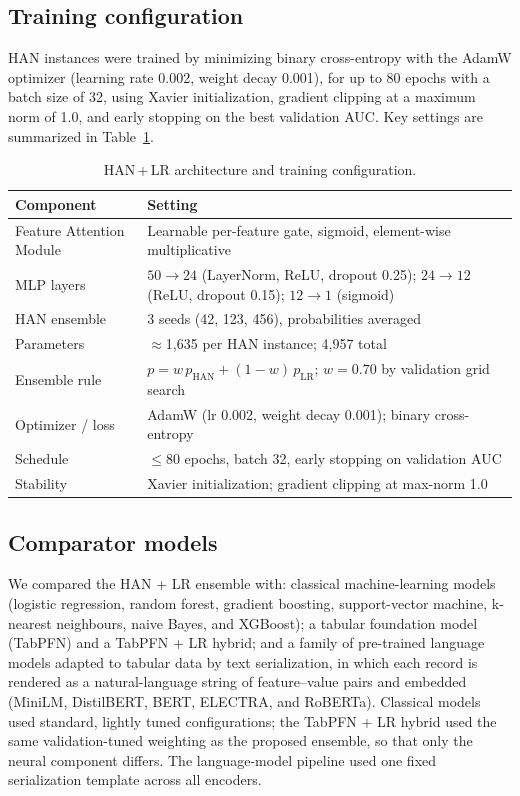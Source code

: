\documentclass[12pt,a4paper]{article}
\begin{document}
\subsection*{Training configuration}

HAN instances were trained by minimizing binary cross-entropy with the AdamW optimizer (learning rate 0.002, weight decay 0.001), for up to 80 epochs with a batch size of 32, using Xavier initialization, gradient clipping at a maximum norm of 1.0, and early stopping on the best validation AUC. Key settings are summarized in Table~\ref{tab::config}.

\begin{table}[H]
\setlength{\abovecaptionskip}{5pt}
\caption{HAN\,+\,LR architecture and training configuration.}
\label{tab::config}
\centering
\footnotesize
\begin{tabular}{@{}p{}p{}@{}}
\toprule
\textbf{Component} & \textbf{Setting} \\
\midrule
Feature Attention Module & Learnable per-feature gate, sigmoid, element-wise multiplicative \\
MLP layers & $50\rightarrow24$ (LayerNorm, ReLU, dropout 0.25); $24\rightarrow12$ (ReLU, dropout 0.15); $12\rightarrow1$ (sigmoid) \\
HAN ensemble & 3 seeds (42, 123, 456), probabilities averaged \\
Parameters & $\approx$1,635 per HAN instance; 4,957 total \\
Ensemble rule & $p = w\,p_{\mathrm{HAN}} + (1-w)\,p_{\mathrm{LR}}$; $w=0.70$ by validation grid search \\
Optimizer / loss & AdamW (lr 0.002, weight decay 0.001); binary cross-entropy \\
Schedule & $\le$80 epochs, batch 32, early stopping on validation AUC \\
Stability & Xavier initialization; gradient clipping at max-norm 1.0 \\
\bottomrule
\end{tabular}
\end{table}

\subsection*{Comparator models}

We compared the HAN + LR ensemble with: classical machine-learning models (logistic regression, random forest, gradient boosting, support-vector machine, k-nearest neighbours, naive Bayes, and XGBoost); a tabular foundation model (TabPFN) and a TabPFN + LR hybrid; and a family of pre-trained language models adapted to tabular data by text serialization, in which each record is rendered as a natural-language string of feature–value pairs and embedded (MiniLM, DistilBERT, BERT, ELECTRA, and RoBERTa).\cite{tabpfnIclr,tabllm} Classical models used standard, lightly tuned configurations; the TabPFN + LR hybrid used the same validation-tuned weighting as the proposed ensemble, so that only the neural component differs. The language-model pipeline used one fixed serialization template across all encoders.
\end{document}
